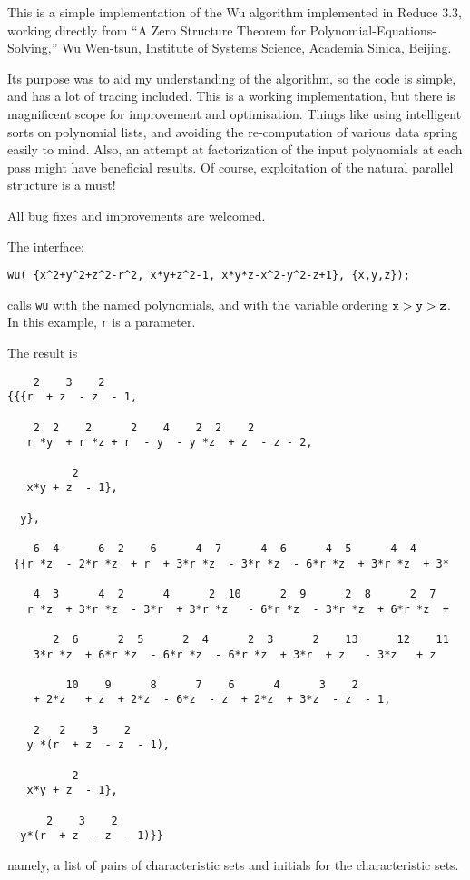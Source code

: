 
This is a simple implementation of the Wu algorithm implemented in Reduce
3.3, working directly from
``A Zero Structure Theorem for Polynomial-Equations-Solving,''
Wu Wen-tsun, Institute of Systems Science, Academia Sinica, Beijing.

Its purpose was to aid my understanding of the algorithm, so the code is
simple, and has a lot of tracing included. This is a working implementation,
but there is magnificent scope for improvement and optimisation. Things
like using intelligent sorts on polynomial lists, and avoiding the
re-computation of various data spring easily to mind. Also, an attempt
at factorization of the input polynomials at each pass might have beneficial
results. Of course, exploitation of the natural parallel structure is a must!

All bug fixes and improvements are welcomed.

The interface:
\begin{verbatim}
wu( {x^2+y^2+z^2-r^2, x*y+z^2-1, x*y*z-x^2-y^2-z+1}, {x,y,z});
\end{verbatim}
calls {\tt wu} with the named polynomials, and with the variable ordering
${\tt x} > {\tt y} > {\tt z}$. In this example, {\tt r} is a parameter.

The result is
\begin{verbatim}
    2    3    2
{{{r  + z  - z  - 1,

    2  2    2      2    4    2  2    2
   r *y  + r *z + r  - y  - y *z  + z  - z - 2,

          2
   x*y + z  - 1},

  y},

    6  4      6  2    6      4  7      4  6      4  5      4  4
 {{r *z  - 2*r *z  + r  + 3*r *z  - 3*r *z  - 6*r *z  + 3*r *z  + 3*

    4  3      4  2      4      2  10      2  9      2  8      2  7
   r *z  + 3*r *z  - 3*r  + 3*r *z   - 6*r *z  - 3*r *z  + 6*r *z  +

       2  6      2  5      2  4      2  3      2    13      12    11
    3*r *z  + 6*r *z  - 6*r *z  - 6*r *z  + 3*r  + z   - 3*z   + z

         10    9      8      7    6      4      3    2
    + 2*z   + z  + 2*z  - 6*z  - z  + 2*z  + 3*z  - z  - 1,

    2   2    3    2
   y *(r  + z  - z  - 1),

          2
   x*y + z  - 1},

      2    3    2
  y*(r  + z  - z  - 1)}}
\end{verbatim}
namely, a list of pairs of characteristic sets and initials for the
characteristic sets.

